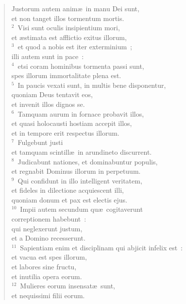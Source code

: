 

\begin{flushleft}\begin{verse}\vspace{-19pt}Justorum autem anim\ae\ in manu Dei sunt,\\ et non tanget illos tormentum mortis.\\
${}^{2}$~Visi sunt oculis insipientium mori,\\ et \ae stimata est afflictio exitus illorum,\\
${}^{3}$~et quod a nobis est iter exterminium~;\\ illi autem sunt in pace~:\\
${}^{4}$~etsi coram hominibus tormenta passi sunt,\\ spes illorum immortalitate plena est.\\
${}^{5}$~In paucis vexati sunt, in multis bene disponentur,\\ quoniam Deus tentavit eos,\\ et invenit illos dignos se.\\
${}^{6}$~Tamquam aurum in fornace probavit illos,\\ et quasi holocausti hostiam accepit illos,\\ et in tempore erit respectus illorum.\\
${}^{7}$~Fulgebunt justi\\ et tamquam scintill\ae\ in arundineto discurrent.\\
${}^{8}$~Judicabunt nationes, et dominabuntur populis,\\ et regnabit Dominus illorum in perpetuum.\\
${}^{9}$~Qui confidunt in illo intelligent veritatem,\\ et fideles in dilectione acquiescent illi,\\ quoniam donum et pax est electis ejus.\\
${}^{10}$~Impii autem secundum qu\ae\ cogitaverunt\\ correptionem habebunt~:\\ qui neglexerunt justum,\\ et a Domino recesserunt.\\
${}^{11}$~Sapientiam enim et disciplinam qui abjicit infelix est~:\\ et vacua est spes illorum,\\ et labores sine fructu,\\ et inutilia opera eorum.\\
${}^{12}$~Mulieres eorum insensat\ae\ sunt,\\ et nequissimi filii eorum.\\

\end{verse}
\end{flushleft}
